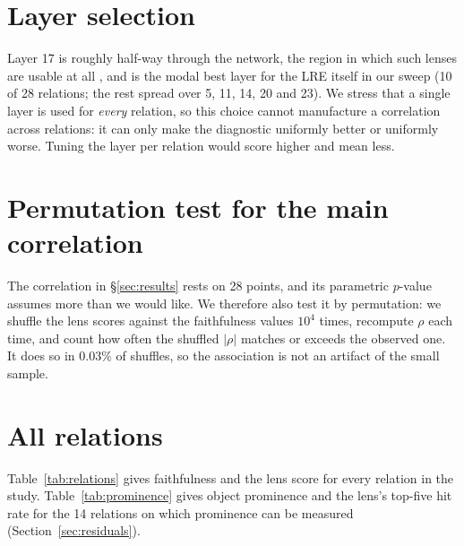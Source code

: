 \documentclass[11pt]{article}
\begin{document}
\section{Layer selection}
\label{sec:layer17}
Layer 17 is roughly half-way through the network,
the region in which such lenses are usable at all
\citep{gurnee2026workspace}, and is the modal best layer for the LRE
itself in our sweep (10 of 28 relations; the rest spread over 5, 11, 14,
20 and 23). We stress that a single layer is used for \emph{every}
relation, so this choice cannot manufacture a correlation across
relations: it can only make the diagnostic uniformly better or uniformly
worse. Tuning the layer per relation would score higher and mean less.


\section{Permutation test for the main correlation}
\label{sec:permutation}

The correlation in \S\ref{sec:results} rests on 28 points, and its
parametric $p$-value assumes more than we would like. We therefore also
test it by permutation: we shuffle the lens scores against the
faithfulness values $10^4$ times, recompute $\rho$ each time, and count
how often the shuffled $|\rho|$ matches or exceeds the observed one. It
does so in $0.03\%$ of shuffles, so the association is not an artifact of
the small sample.

\section{All relations}

Table~\ref{tab:relations} gives faithfulness and the lens score for every
relation in the study. Table~\ref{tab:prominence} gives object prominence
and the lens's top-five hit rate for the 14 relations on which prominence
can be measured (Section~\ref{sec:residuals}).


\end{document}
